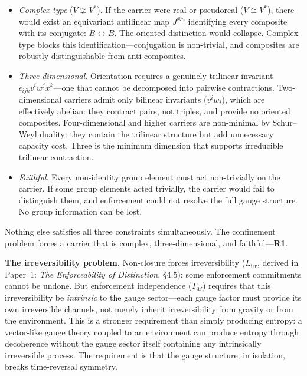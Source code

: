\documentclass[11pt]{article}
\newenvironment{varlist}{\begin{itemize}[nosep,leftmargin=2em]}{\end{itemize}}
\begin{document}
\begin{varlist}
\item \textit{Complex type} ($V \not\cong V^*$).  If the carrier were real or pseudoreal ($V \cong V^*$), there would exist an equivariant antilinear map $J^{\otimes n}$ identifying every composite with its conjugate: $B \leftrightarrow \bar{B}$.  The oriented distinction would collapse.  Complex type blocks this identification---conjugation is non-trivial, and composites are robustly distinguishable from anti-composites.
\item \textit{Three-dimensional}.  Orientation requires a genuinely trilinear invariant $\epsilon_{ijk} v^i w^j x^k$---one that cannot be decomposed into pairwise contractions.  Two-dimensional carriers admit only bilinear invariants ($v^i w_i$), which are effectively abelian: they contract pairs, not triples, and provide no oriented composites.  Four-dimensional and higher carriers are non-minimal by Schur--Weyl duality: they contain the trilinear structure but add unnecessary capacity cost.  Three is the minimum dimension that supports irreducible trilinear contraction.
\item \textit{Faithful}.  Every non-identity group element must act non-trivially on the carrier.  If some group elements acted trivially, the carrier would fail to distinguish them, and enforcement could not resolve the full gauge structure.  No group information can be lost.
\end{varlist}

\noindent Nothing else satisfies all three constraints simultaneously.  The confinement problem forces a carrier that is complex, three-dimensional, and faithful---\textbf{R1}.

\medskip
\textbf{The irreversibility problem.}  Non-closure forces irreversibility ($L_{\mathrm{irr}}$, derived in Paper~1: \emph{The Enforceability of Distinction}, \S4.5): some enforcement commitments cannot be undone.  But enforcement independence ($T_M$) requires that this irreversibility be \emph{intrinsic} to the gauge sector---each gauge factor must provide its own irreversible channels, not merely inherit irreversibility from gravity or from the environment.  This is a stronger requirement than simply producing entropy: a vector-like gauge theory coupled to an environment can produce entropy through decoherence without the gauge sector itself containing any intrinsically irreversible process.  The requirement is that the gauge structure, in isolation, breaks time-reversal symmetry.
\end{document}
